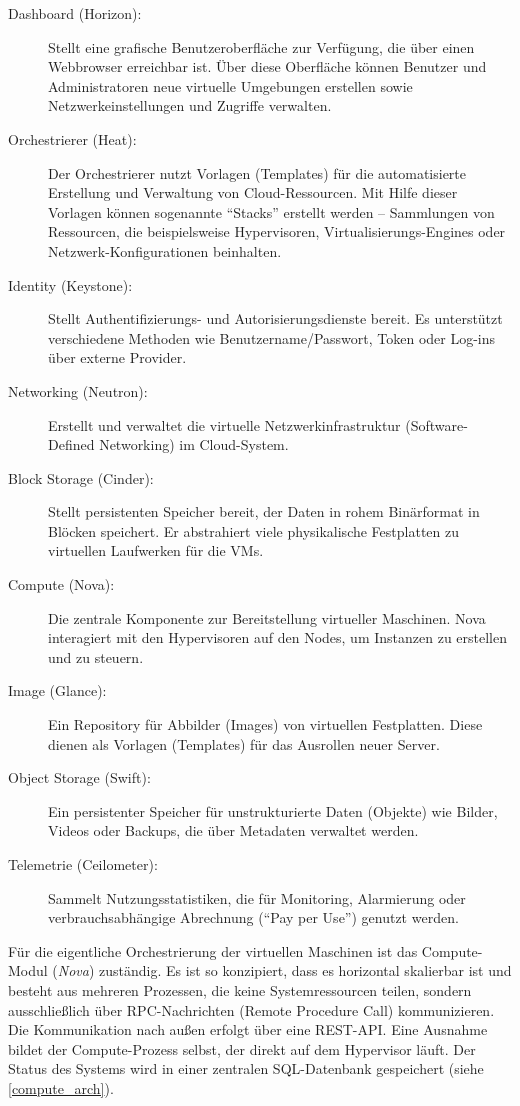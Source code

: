 \begin{description}
    \item[Dashboard (Horizon):] Stellt eine grafische Benutzeroberfläche zur Verfügung, die über einen Webbrowser erreichbar ist. Über diese Oberfläche können Benutzer und Administratoren neue virtuelle Umgebungen erstellen sowie Netzwerkeinstellungen und Zugriffe verwalten.
    \item[Orchestrierer (Heat):] Der Orchestrierer nutzt Vorlagen (Templates) für die automatisierte Erstellung und Verwaltung von Cloud-Ressourcen. Mit Hilfe dieser Vorlagen können sogenannte \enquote{Stacks} erstellt werden – Sammlungen von Ressourcen, die beispielsweise Hypervisoren, Virtualisierungs-Engines oder Netzwerk-Konfigurationen beinhalten.
    \item[Identity (Keystone):] Stellt Authentifizierungs- und Autorisierungsdienste bereit. Es unterstützt verschiedene Methoden wie Benutzername/Passwort, Token oder Log-ins über externe Provider.
    \item[Networking (Neutron):] Erstellt und verwaltet die virtuelle Netzwerkinfrastruktur (Software-Defined Networking) im Cloud-System.
    \item[Block Storage (Cinder):] Stellt persistenten Speicher bereit, der Daten in rohem Binärformat in Blöcken speichert. Er abstrahiert viele physikalische Festplatten zu virtuellen Laufwerken für die VMs.
    \item[Compute (Nova):] Die zentrale Komponente zur Bereitstellung virtueller Maschinen. Nova interagiert mit den Hypervisoren auf den Nodes, um Instanzen zu erstellen und zu steuern.
    \item[Image (Glance):] Ein Repository für Abbilder (Images) von virtuellen Festplatten. Diese dienen als Vorlagen (Templates) für das Ausrollen neuer Server.
    \item[Object Storage (Swift):] Ein persistenter Speicher für unstrukturierte Daten (Objekte) wie Bilder, Videos oder Backups, die über Metadaten verwaltet werden.
    \item[Telemetrie (Ceilometer):] Sammelt Nutzungsstatistiken, die für Monitoring, Alarmierung oder verbrauchsabhängige Abrechnung (\enquote{Pay per Use}) genutzt werden.
\end{description}

Für die eigentliche Orchestrierung der virtuellen Maschinen ist das Compute-Modul (\textit{Nova}) zuständig. Es ist so konzipiert, dass es horizontal skalierbar ist und besteht aus mehreren Prozessen, die keine Systemressourcen teilen, sondern ausschließlich über RPC-Nachrichten (Remote Procedure Call) kommunizieren. Die Kommunikation nach außen erfolgt über eine REST-API. Eine Ausnahme bildet der Compute-Prozess selbst, der direkt auf dem Hypervisor läuft. Der Status des Systems wird in einer zentralen SQL-Datenbank gespeichert (siehe \autoref{compute_arch}).

